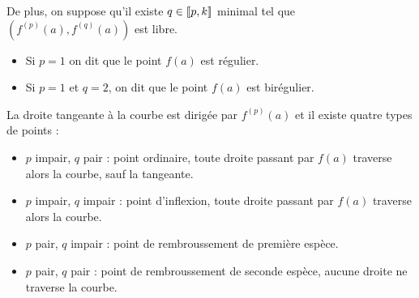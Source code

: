 De plus, on suppose qu'il existe $q \in [\![p, k]\!]$ minimal tel que $\left( f^{(p)}(a), f^{(q)}(a) \right)$ 
est libre.

\begin{itemize}
    \item Si $p = 1$ on dit que le point $f(a)$ est régulier. 
    \item Si $p = 1$ et $q = 2$, on dit que le point $f(a)$ est birégulier. 
\end{itemize}


La droite tangeante à la courbe est dirigée par $f^{(p)}(a)$ et 
il existe quatre types de points : 
\begin{itemize}
    \item $p$ impair, $q$ pair : point ordinaire, toute droite passant par $f(a)$ traverse alors la courbe, sauf la tangeante.
    \item $p$ impair, $q$ impair : point d'inflexion, toute droite passant par $f(a)$ traverse alors la courbe. 
    \item $p$ pair, $q$ impair : point de rembroussement de première espèce. 
    \item $p$ pair, $q$ pair : point de rembroussement de seconde espèce, aucune droite ne traverse la courbe.
\end{itemize}


